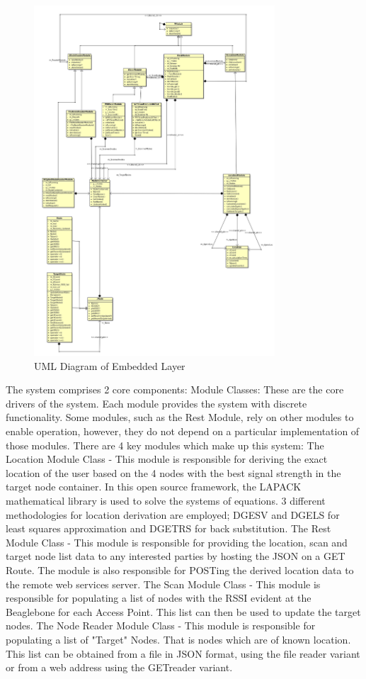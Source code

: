 \documentclass[conference]{IEEEtran}
\begin{document}
\begin{figure}[H]
    \includegraphics[width=9cm,height= 9 cm]{uml_9-5-18.png}
    \caption{UML Diagram of Embedded Layer}
    \end{figure}

The system comprises 2 core components:
\newline
Module Classes: These are the core drivers of the system. Each module provides the system with discrete functionality. Some modules, such as the Rest Module, rely on other modules to enable operation, however, they do not depend on a particular implementation of those modules. \newline
There are 4 key modules which make up this system:
\newline
The Location Module Class - This module is responsible for deriving the exact location of the user based on the 4 nodes with the best signal strength in the target node container. In this open source framework, the LAPACK mathematical library is used to solve the systems of equations. 3 different methodologies for location derivation are employed; DGESV and DGELS for least squares approximation and DGETRS for back substitution.
\newline
The Rest Module Class - This module is responsible for providing the location, scan and target node list data to any interested parties by hosting the JSON on a GET Route. The module is also responsible for POSTing the derived location data to the remote web services server.
\newline
The Scan Module Class - This module is responsible for populating a list of nodes with the RSSI evident at the Beaglebone for each Access Point. This list can then be used to update the target nodes.
\newline
The Node Reader Module Class - This module is responsible for populating a list of "Target" Nodes. That is nodes which are of known location. This list can be obtained from a file in JSON format, using the file reader variant or from a web address using the GETreader variant.
\newline
 
\end{document}
